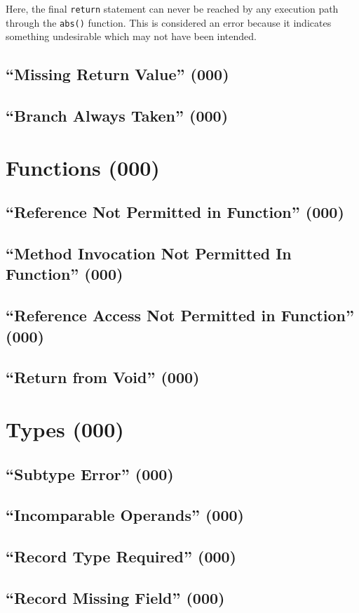 Here, the final \lstinline{return} statement can never be reached by any execution path through the \lstinline{abs()} function.  This is considered an error because it indicates something undesirable which may not have been intended.

\subsection{``Missing Return Value'' (000)}

\subsection{``Branch Always Taken'' (000)}

\section{Functions (000)}

\subsection{``Reference Not Permitted in Function'' (000)}

\subsection{``Method Invocation Not Permitted In Function'' (000)}

\subsection{``Reference Access Not Permitted in Function'' (000)}

\subsection{``Return from Void'' (000)}
	
\section{Types (000)}

\subsection{``Subtype Error'' (000)}

\subsection{``Incomparable Operands'' (000)}

\subsection{``Record Type Required'' (000)}

\subsection{``Record Missing Field'' (000)}

